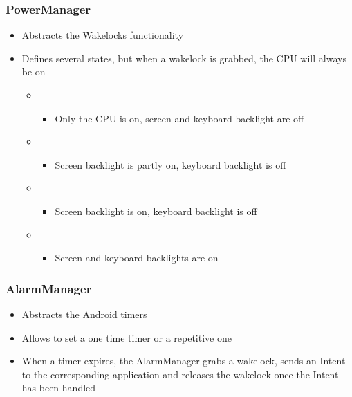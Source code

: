 \begin{frame}
  \frametitle{PowerManager}
  \begin{itemize}
  \item Abstracts the Wakelocks functionality
  \item Defines several states, but when a wakelock is grabbed,
    the CPU will always be on
    \begin{itemize}
    \item {}
      \begin{itemize}
      \item Only the CPU is on, screen and keyboard backlight are off
      \end{itemize}
    \item {}
      \begin{itemize}
      \item Screen backlight is partly on, keyboard backlight is off
      \end{itemize}
    \item {}
      \begin{itemize}
      \item Screen backlight is on, keyboard backlight is off
      \end{itemize}
    \item {}
      \begin{itemize}
      \item Screen and keyboard backlights are on
      \end{itemize}
    \end{itemize}
  \end{itemize}
\end{frame}

\begin{frame}
  \frametitle{AlarmManager}
  \begin{itemize}
  \item Abstracts the Android timers
  \item Allows to set a one time timer or a repetitive one
  \item When a timer expires, the AlarmManager grabs a wakelock,
    sends an Intent to the corresponding application and releases
    the wakelock once the Intent has been handled
  \end{itemize}
\end{frame}

